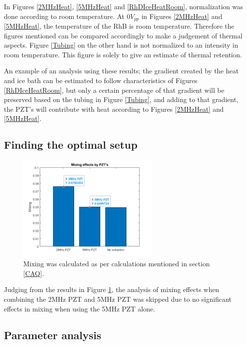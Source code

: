 \documentclass[twoside,twocolumn,9pt,a4paper]{IEEEtran}
\begin{document}
In Figures \ref{2MHzHeat}, \ref{5MHzHeat} and \ref{RhDIceHeatRoom}, normalization was done according to room temperature. At $0 V_{pp}$ in Figures \ref{2MHzHeat} and \ref{5MHzHeat}, the temperature of the RhB is room temperature. Therefore the figures mentioned can be compared accordingly to make a judgement of thermal aspects. Figure \ref{Tubing} on the other hand is not normalized to an intensity in room temperature. This figure is solely to give an estimate of thermal retention.

An example of an analysis using these results; the gradient created by the heat and ice bath can be estimated to follow characteristics of Figures \ref{RhDIceHeatRoom}, but only a certain percentage of that gradient will be preserved based on the tubing in Figure \ref{Tubing}, and adding to that gradient, the PZT's will contribute with heat according to Figures \ref{2MHzHeat} and \ref{5MHzHeat}.

\subsection{Finding the optimal setup}

\begin{figure}[H]
\begin{center}
\includegraphics[width=7cm]{Images/Images from Jonte/Mixing effects by PZT_s.png} %
\caption{Mixing was calculated as per calculations mentioned in section \ref{CAQ}.}
\label{PZT}
\end{center}
\end{figure} %

Judging from the results in Figure \ref{PZT}, the analysis of mixing effects when combining the 2MHz PZT and 5MHz PZT was skipped due to no significant effects in mixing when using the 5MHz PZT alone.

\subsection{Parameter analysis}
\end{document}
